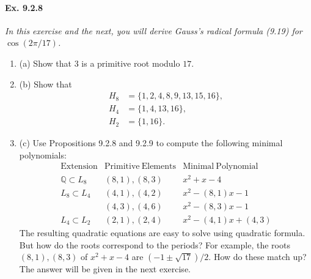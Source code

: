\documentclass[11pt,a4paper]{article}
\newcommand{\be} {\begin{enumerate}}
\newcommand{\ee} {\end{enumerate}}
\newcommand{\Q}{\mathbb{Q}}
\begin{document}
\paragraph{Ex. 9.2.8}

{\it In this exercise and the next, you will derive Gauss's radical formula (9.19) for $\cos(2\pi/17)$.
\be
\item[(a)] Show that $3$ is a primitive root modulo $17$.
\item[(b)] Show that
   \begin{align*}
   H_8 &= \{1,2,4,8,9,13,15,16\},\\
   H_4 &= \{1,4,13,16\},\\
   H_2 &= \{1,16\}.
   \end{align*}
   \item[(c)]Use Propositions 9.2.8 and 9.2.9 to compute the following minimal polynomials:
$$
\begin{array}{c|c|c}
 \mathrm{Extension} & \mathrm{Primitive}\  \mathrm{Elements}   &   \mathrm{Minimal}\  \mathrm{Polynomial} \\
 \hline
 \Q\subset L_8 & (8,1),(8,3)  &  x^2+x-4 \\
  \hline
 L_8\subset L_4 & (4,1),(4,2)  &  x^2 -(8,1)x-1  \\
 & (4,3),(4,6) & x^2-(8,3)x-1\\
   \hline
  L_4 \subset L_2& (2,1),(2,4) & x^2-(4,1)x+(4,3)
\end{array}
$$
The resulting quadratic equations are easy to solve using quadratic formula. But how do the roots correspond to the periods? For example, the roots $(8,1),(8,3)$ of $x^2+x-4$ are $(-1\pm\sqrt{17})/2$. How do these match up? The answer will be given in the next exercise.
\ee}
\end{document}
